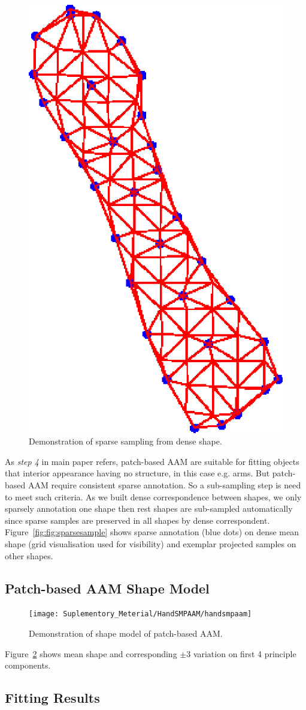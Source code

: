 \begin{figure}[!t]
\centering
\includegraphics[width=0.3\columnwidth]{Suplementory_Meterial/dsg}
\caption{Demonstration of sparse sampling from dense shape.}
\label{fig:sparsesample}
\end{figure}

As \emph{step 4} in main paper refers, patch-based AAM are suitable for fitting objects that interior appearance having no structure, in this case e.g. arms. But patch-based AAM require consistent sparse annotation. So a sub-sampling step is need to meet such criteria. As we built dense correspondence between shapes, we only sparsely annotation one shape then rest shapes are sub-sampled automatically since sparse samples are preserved in all shapes by dense correspondent. Figure~\ref{fig:fig:sparsesample} shows sparse annotation (blue dots) on dense mean shape (grid visualisation used for visibility) and exemplar projected samples on other shapes.

\subsection{Patch-based AAM Shape Model}
\label{sec:paam_sm}

\begin{figure}[!t]
\centering
\texttt{[image: Suplementory\_Meterial/HandSMPAAM/handsmpaam]}
\caption{Demonstration of shape model of patch-based AAM.}
\label{fig:paam_sm}
\end{figure}

Figure~\ref{fig:paam_sm} shows mean shape and corresponding $\pm 3$ variation on first 4 principle components.

\subsection{Fitting Results}
\label{sec:paam_fittingresults}


